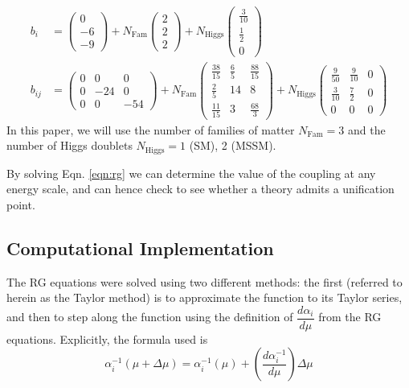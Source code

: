 \documentclass[12pt,a4paper,oneside]{article}
\begin{document}
\begin{align}
b_i &= 
\begin{pmatrix} 0 \\ -6 \\ -9 \end{pmatrix} 
+ N_\mathrm{Fam} \begin{pmatrix} 2 \\ 2 \\ 2 \end{pmatrix} 
+ N_\mathrm{Higgs} \begin{pmatrix} \frac{3}{10} \\ \frac{1}{2} \\ 0 \end{pmatrix} \\
b_{ij} &= 
\begin{pmatrix} 
0 & 0 & 0 \\ 
0 & -24 & 0 \\ 
0 & 0 & -54
\end{pmatrix}
+ N_\mathrm{Fam} 
\begin{pmatrix} 
\frac{38}{15} & \frac{6}{5} & \frac{88}{15} \\ 
\frac{2}{5} & 14 & 8 \\ 
\frac{11}{15} & 3 & \frac{68}{3}
\end{pmatrix}
+ N_\mathrm{Higgs}
\begin{pmatrix}
\frac{9}{50} & \frac{9}{10} & 0 \\
\frac{3}{10} & \frac{7}{2} & 0 \\
0 & 0 & 0
\end{pmatrix} 
\end{align}
\doublespace
In this paper, we will use the number of families of matter $N_\mathrm{Fam} = 3$ and the number of Higgs doublets $N_\mathrm{Higgs} = 1$ (SM), 2 (MSSM).

By solving Eqn. \ref{eqn:rg} we can determine the value of the coupling at any energy scale, and can hence check to see whether a theory admits a unification point.

\subsection{Computational Implementation}

The RG equations were solved using two different methods: the first (referred to herein as the Taylor method) is to approximate the function to its Taylor series, and then to step along the function using the definition of $\dfrac{d \alpha_i}{d \mu}$ from the RG equations. Explicitly, the formula used is
\begin{equation}
\alpha_i^{-1} (\mu + \Delta \mu) = \alpha_i^{-1} (\mu) + \left(\dfrac{d \alpha_i^{-1}}{d \mu}\right) \Delta \mu
\label{eqn:taylor}
\end{equation}
\end{document}
